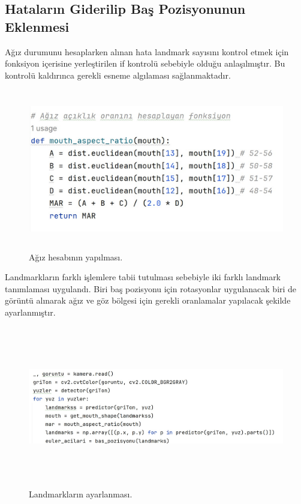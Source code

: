 \documentclass[12pt, a4paper]{article}
\begin{document}
		\subsection{ Hataların Giderilip Baş Pozisyonunun Eklenmesi }
		Ağız durumunu hesaplarken alınan hata landmark sayısını kontrol etmek için fonksiyon içerisine yerleştirilen if kontrolü sebebiyle olduğu anlaşılmıştır. Bu kontrolü kaldırınca gerekli esneme algılaması sağlanmaktadır. \par 
		\begin{figure}[!h]
			\centering
			\includegraphics[width=17cm, height=7cm, keepaspectratio]{agizhesap.jpg}
			\caption{Ağız hesabının yapılması.} 
		\end{figure}
		Landmarkların farklı işlemlere tabii tutulması sebebiyle iki farklı landmark tanımlaması uygulandı. Biri baş pozisyonu için rotasyonlar uygulanacak biri de görüntü alınarak ağız ve göz bölgesi için gerekli oranlamalar yapılacak şekilde ayarlanmıştır. \par
		\begin{figure}[!h]
			\centering
			\includegraphics[width=17cm, height=7cm, keepaspectratio]{ikilandmark.jpg}
			\caption{Landmarkların ayarlanması.} 
		\end{figure}
\end{document}
